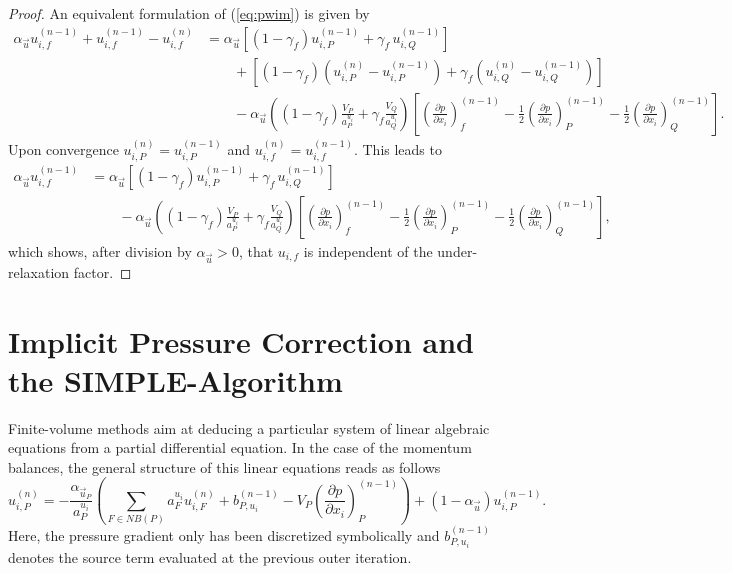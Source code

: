 \begin{proof}
  An equivalent formulation of (\ref{eq:pwim}) is given by
\begin{align*}
  \alpha_\vec{u} u_{i,f}^{(n-1)} + u_{i,f}^{(n-1)} - u_{i,f}^{(n)} 
  &=
  \alpha_\vec{u} \left[\left(1 - \gamma_f\right) u_{i,P}^{(n-1)} + \gamma_f \, u_{i,Q}^{(n-1)} \right] \\[1em]
  &\quad\quad + \left[\left(1 - \gamma_f\right) \left( u_{i,P}^{(n)} - u_{i,P}^{(n-1)}\right) + \gamma_f \left( u_{i,Q}^{(n)} - u_{i,Q}^{(n-1)} \right) \right] \nonumber\\[1em]
  &\quad\quad - 
  \alpha_\vec{u} \left(\left(1 - \gamma_f\right) \frac{ V_P}{a_P^{u_i}} + \gamma_f \frac{V_Q}{a_Q^{u_i}}\right)
  \left[ 
  \left(\frac{\partial p}{\partial x_i}\right)_f^{(n-1)} 
  - \frac{1}{2} \left( \frac{\partial p}{\partial x_i} \right)_P^{(n-1)} 
  - \frac{1}{2} \left(\frac{\partial p}{\partial x_i}\right)_Q^{(n-1)} 
  \right]. \nonumber
\end{align*}
Upon convergence \(u_{i,P}^{(n)} = u_{i,P}^{(n-1)}\) and \(u_{i,f}^{(n)} = u_{i,f}^{(n-1)}\). This leads to
\begin{align*}
  \alpha_\vec{u} u_{i,f}^{(n-1)} 
  &=
  \alpha_\vec{u} \left[\left(1 - \gamma_f\right) u_{i,P}^{(n-1)} + \gamma_f \, u_{i,Q}^{(n-1)} \right] \\[1em]
  &\quad\quad - 
  \alpha_\vec{u} \left(\left(1 - \gamma_f\right) \frac{ V_P}{a_P^{u_i}} + \gamma_f \frac{V_Q}{a_Q^{u_i}}\right)
  \left[ 
  \left(\frac{\partial p}{\partial x_i}\right)_f^{(n-1)} 
  - \frac{1}{2} \left( \frac{\partial p}{\partial x_i} \right)_P^{(n-1)} 
  - \frac{1}{2} \left(\frac{\partial p}{\partial x_i}\right)_Q^{(n-1)} 
  \right], \nonumber
\end{align*}
which shows, after division by \(\alpha_\vec{u} > 0\), that \(u_{i,f}\) is independent of the under-relaxation factor.
\end{proof}

\section{Implicit Pressure Correction and the SIMPLE-Algorithm}
\label{sec:simple}

Finite-volume methods aim at deducing a particular system of linear algebraic equations from a partial differential equation. In the case of the momentum balances, the general structure of this linear equations reads as follows
\begin{displaymath}
  \label{eq:linfinal}
  u_{i,P}^{(n)} 
  = 
  - \frac{\alpha_{\vec{u}_P}}{a_P^{u_i}} \left(\sum_{F \in NB(P)} a_F^{u_i} u_{i,F}^{(n)}
  +                                     b_{P,u_i}^{(n-1)} 
  -                                     V_P\left(\frac{\partial p}{\partial x_i}\right)_P^{(n-1)} \right)
  + \left(1 - \alpha_{\vec{u}}\right) u_{i,P}^{(n-1)}.
\end{displaymath}
Here, the pressure gradient only has been discretized symbolically and \(b_{P,u_i}^{(n-1)}\) denotes the source term evaluated at the previous outer iteration.

